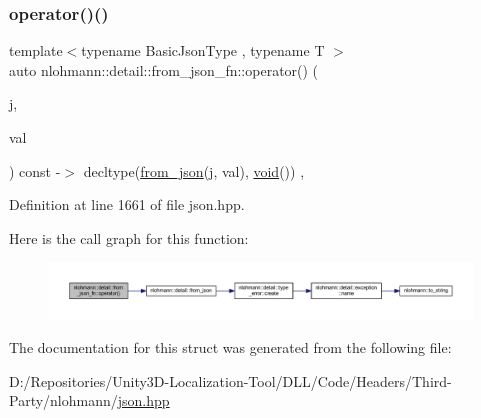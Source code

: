 \subsubsection{\texorpdfstring{operator()()}{operator()()}}
{\footnotesize\ttfamily template$<$typename Basic\+Json\+Type , typename T $>$ \\
auto nlohmann\+::detail\+::from\+\_\+json\+\_\+fn\+::operator() (\begin{DoxyParamCaption}\item[{const Basic\+Json\+Type \&}]{j,  }\item[{T \&}]{val }\end{DoxyParamCaption}) const -\/$>$ decltype(\mbox{\hyperlink{namespacenlohmann_1_1detail_a1f0395aad0fe853a4539288749d3a603}{from\+\_\+json}}(j, val), \mbox{\hyperlink{namespacenlohmann_1_1detail_a59fca69799f6b9e366710cb9043aa77d}{void}}())
    \hspace{0.3cm}{\ttfamily [inline]}, {\ttfamily [noexcept]}}



Definition at line 1661 of file json.\+hpp.

Here is the call graph for this function\+:
\nopagebreak
\begin{figure}[H]
\begin{center}
\leavevmode
\includegraphics[width=350pt]{structnlohmann_1_1detail_1_1from__json__fn_a6d14a74e1043072c77892534572d2973_cgraph}
\end{center}
\end{figure}


The documentation for this struct was generated from the following file\+:\begin{DoxyCompactItemize}
\item 
D\+:/\+Repositories/\+Unity3\+D-\/\+Localization-\/\+Tool/\+D\+L\+L/\+Code/\+Headers/\+Third-\/\+Party/nlohmann/\mbox{\hyperlink{json_8hpp}{json.\+hpp}}\end{DoxyCompactItemize}

